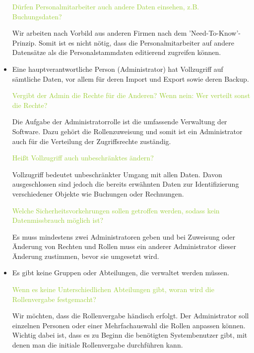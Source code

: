 \begin{itemize}
    \textcolor{YellowGreen}{Dürfen Personalmitarbeiter auch andere Daten einsehen, z.B. Buchungsdaten?}

    \textcolor{NavyBlue}{Wir arbeiten nach Vorbild aus anderen Firmen nach dem 'Need-To-Know'-Prinzip. Somit ist es nicht nötig, dass die Personalmitarbeiter auf andere Datensätze als die Personalstammdaten editierend zugreifen können.}

    \item Eine hauptverantwortliche Person (Administrator) hat Vollzugriff auf sämtliche Daten, vor allem für deren Import und Export sowie deren Backup. 
    
    \textcolor{YellowGreen}{Vergibt der Admin die Rechte für die Anderen? Wenn nein: Wer verteilt sonst die Rechte?}

    \textcolor{NavyBlue}{Die Aufgabe der Administratorrolle ist die umfassende Verwaltung der Software. Dazu gehört die Rollenzuweisung und somit ist ein Administrator auch für die Verteilung der Zugriffsrechte zuständig.}

    \textcolor{YellowGreen}{Heißt Vollzugriff auch unbeschränktes ändern?}

    \textcolor{NavyBlue}{Vollzugriff bedeutet unbeschränkter Umgang mit allen Daten. Davon ausgeschlossen sind jedoch die bereits erwähnten Daten zur Identifizierung verschiedener Objekte wie Buchungen oder Rechnungen.}

    \textcolor{YellowGreen}{Welche Sicherheitsvorkehrungen sollen getroffen werden, sodass kein Datenmissbrauch möglich ist?}

    \textcolor{NavyBlue}{Es muss mindestens zwei Administratoren geben und bei Zuweisung oder Änderung von Rechten und Rollen muss ein anderer Administrator dieser Änderung zustimmen, bevor sie umgesetzt wird.}

    \item Es gibt keine Gruppen oder Abteilungen, die verwaltet werden müssen.
    
    \textcolor{YellowGreen}{Wenn es keine Unterschiedlichen Abteilungen gibt, woran wird die Rollenvergabe festgemacht?}

    \textcolor{NavyBlue}{Wir möchten, dass die Rollenvergabe händisch erfolgt. Der Administrator soll einzelnen Personen oder einer Mehrfachauswahl die Rollen anpassen können. Wichtig dabei ist, dass es zu Beginn die benötigten Systembenutzer gibt, mit denen man die initiale Rollenvergabe durchführen kann.}

\end{itemize}

